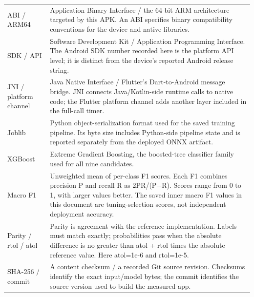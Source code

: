 \documentclass[10pt,a4paper]{article}
\begin{document}
\begin{longtable}{@{}>{\raggedright\arraybackslash}p{}>{\raggedright\arraybackslash}p{}@{}}
ABI /\allowbreak{} ARM64 & Application Binary Interface /\allowbreak{} the 64-bit ARM architecture targeted by this APK. An ABI specifies binary compatibility conventions for the device and native libraries. \\
SDK /\allowbreak{} API & Software Development Kit /\allowbreak{} Application Programming Interface. The Android SDK number recorded here is the platform API level; it is distinct from the device's reported Android release string. \\
JNI /\allowbreak{} platform channel & Java Native Interface /\allowbreak{} Flutter's Dart-to-Android message bridge. JNI connects Java/\allowbreak{}Kotlin-side runtime calls to native code; the Flutter platform channel adds another layer included in the full-call timer. \\
Joblib & Python object-serialization format used for the saved training pipeline. Its byte size includes Python-side pipeline state and is reported separately from the deployed ONNX artifact. \\
XGBoost & Extreme Gradient Boosting, the boosted-tree classifier family used for all nine candidates. \\
Macro F1 & Unweighted mean of per-class F1 scores. Each F1 combines precision P and recall R as 2PR/\allowbreak{}(P+R). Scores range from 0 to 1, with larger values better. The saved inner macro F1 values in this document are tuning-selection scores, not independent deployment accuracy. \\
Parity /\allowbreak{} rtol /\allowbreak{} atol & Parity is agreement with the reference implementation. Labels must match exactly; probabilities pass when the absolute difference is no greater than atol + rtol times the absolute reference value. Here atol=1e-6 and rtol=1e-5. \\
SHA-256 /\allowbreak{} commit & A content checksum /\allowbreak{} a recorded Git source revision. Checksums identify the exact input/\allowbreak{}model bytes; the commit identifies the source version used to build the measured app. \\
\end{longtable}\endgroup
\clearpage
\end{document}
